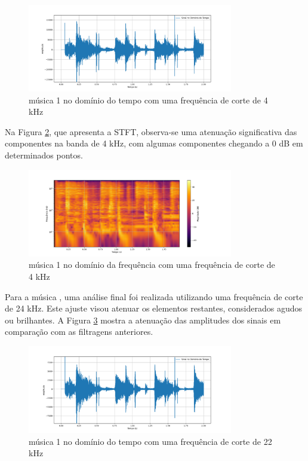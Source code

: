 \begin{figure}[h]
    \centering
    \includegraphics[width=0.8\textwidth]{figuras/fig26.png}
    \caption{música 1 no domínio do tempo com uma frequência de corte de 4 kHz}
    \label{fig26}
\end{figure}

Na Figura \ref{fig27}, que apresenta a STFT, observa-se uma atenuação significativa das componentes na banda de 4 kHz, com algumas componentes chegando a 0 dB em determinados pontos.

\begin{figure}[h]
    \centering
    \includegraphics[width=0.8\textwidth]{figuras/fig27.png}
    \caption{música 1 no domínio da frequência com uma frequência de corte de 4 kHz}
    \label{fig27}
\end{figure}

Para a música \cite{track01}, uma análise final foi realizada utilizando uma frequência de corte de 24 kHz. Este ajuste visou atenuar os elementos restantes, considerados agudos ou brilhantes. A Figura \ref{fig30} mostra a atenuação das amplitudes dos sinais em comparação com as filtragens anteriores.

\begin{figure}[h]
    \centering
    \includegraphics[width=0.8\textwidth]{figuras/fig30.png}
    \caption{música 1 no domínio do tempo com uma frequência de corte de 22 kHz}
    \label{fig30}
\end{figure}

